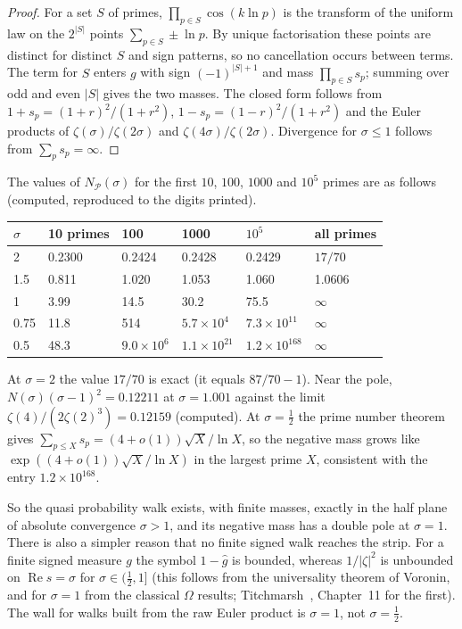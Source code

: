 \begin{proof}
For a set $S$ of primes, $\prod_{p\in S}\cos(k\ln p)$ is the transform of the uniform law on the $2^{|S|}$ points $\sum_{p\in S}\pm\ln p$. By unique factorisation these points are distinct for distinct $S$ and sign patterns, so no cancellation occurs between terms. The term for $S$ enters $g$ with sign $(-1)^{|S|+1}$ and mass $\prod_{p\in S}s_p$; summing over odd and even $|S|$ gives the two masses. The closed form follows from $1+s_p=(1+r)^2/(1+r^2)$, $1-s_p=(1-r)^2/(1+r^2)$ and the Euler products of $\zeta(\sigma)/\zeta(2\sigma)$ and $\zeta(4\sigma)/\zeta(2\sigma)$. Divergence for $\sigma\le1$ follows from $\sum_ps_p=\infty$.
\end{proof}

The values of $N_{\mathcal P}(\sigma)$ for the first $10$, $100$, $1000$ and $10^5$ primes are as follows (computed, reproduced to the digits printed).
\begin{center}
\small
\begin{tabular}{llllll}
\toprule
$\sigma$ & 10 primes & 100 & 1000 & $10^5$ & all primes\\
\midrule
2 & 0.2300 & 0.2424 & 0.2428 & 0.2429 & $17/70$\\
1.5 & 0.811 & 1.020 & 1.053 & 1.060 & 1.0606\\
1 & 3.99 & 14.5 & 30.2 & 75.5 & $\infty$\\
0.75 & 11.8 & 514 & $5.7\times10^4$ & $7.3\times10^{11}$ & $\infty$\\
0.5 & 48.3 & $9.0\times10^6$ & $1.1\times10^{21}$ & $1.2\times10^{168}$ & $\infty$\\
\bottomrule
\end{tabular}
\end{center}
At $\sigma=2$ the value $17/70$ is exact (it equals $87/70-1$). Near the pole, $N(\sigma)(\sigma-1)^2=0.12211$ at $\sigma=1.001$ against the limit $\zeta(4)/(2\zeta(2)^3)=0.12159$ (computed). At $\sigma=\frac12$ the prime number theorem gives $\sum_{p\le X}s_p=(4+o(1))\sqrt X/\ln X$, so the negative mass grows like $\exp((4+o(1))\sqrt X/\ln X)$ in the largest prime $X$, consistent with the entry $1.2\times10^{168}$.

So the quasi probability walk exists, with finite masses, exactly in the half plane of absolute convergence $\sigma>1$, and its negative mass has a double pole at $\sigma=1$. There is also a simpler reason that no finite signed walk reaches the strip. For a finite signed measure $g$ the symbol $1-\hat g$ is bounded, whereas $1/|\zeta|^2$ is unbounded on $\operatorname{Re}s=\sigma$ for $\sigma\in(\frac12,1]$ (this follows from the universality theorem of Voronin, and for $\sigma=1$ from the classical $\Omega$ results; Titchmarsh~\cite{Titchmarsh}, Chapter~11 for the first).
The wall for walks built from the raw Euler product is $\sigma=1$, not $\sigma=\frac12$.

